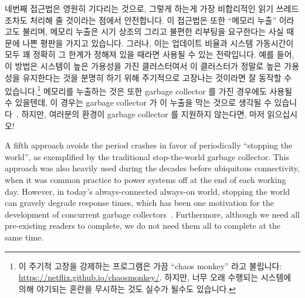 \fi

네번째 접근법은 영원히 기다리는 것으로, 그렇게 하는게 가장 비합리적인 읽기
쓰레드조차도 처리해 줄 것이라는 점에서 안전합니다.
이 접근법은 또한 ``메모리 누출'' 이라고도 불리며, 메모리 누출은 시기 상조의
그리고 불편한 리부팅을 요구한다는 사실 때문에 나쁜 평판을 가지고 있습니다.
그러나, 이는 업데이트 비율과 시스템 가동시간이 모두 꽤 정확히 그 한계가 정해져
있을 때라면 사용될 수 있는 전략입니다.
예를 들어, 이 방법은 시스템이 높은 가용성을 가진 클러스터여서 이 클러스터가
정말로 높은 가용성을 유지한다는 것을 분명히 하기 위해 주기적으로 고장나는
것이라면 잘 동작할 수 있습니다.\footnote{
	이 주기적 고장을 강제하는 프로그램은 가끔 ``chaos monkey'' 라고
	불립니다:
	\url{https://netflix.github.io/chaosmonkey/}.
	하지만, 너무 오래 수행되는 시스템에 의해 야기되는 혼란을 무시하는 것도
	실수가 될수도 있습니다.}
메모리를 누출하는 것은 또한 garbage collector 를 가진 경우에도 사용될 수
있을텐데, 이 경우는 garbage collector 가 이 누출을 막는 것으로 생각될 수
있습니다~\cite{Kung80}.
하지만, 여러분의 환경이 garbage collector 를 지원하지 않는다면, 마저
읽으십시오!

A fifth approach avoids the period crashes in favor of periodically
``stopping the world'', as exemplified by the traditional stop-the-world
garbage collector.
This approach was also heavily used during the decades before
ubiquitous connectivity, when it was common practice to power systems
off at the end of each working day.
However, in today's always-connected always-on world, stopping the world
can gravely degrade response times, which has been one motivation for the
development of concurrent garbage collectors~\cite{DavidFBacon2003RTGC}.
Furthermore, although we need all pre-existing readers to complete, we do
not need them all to complete at the same time.

